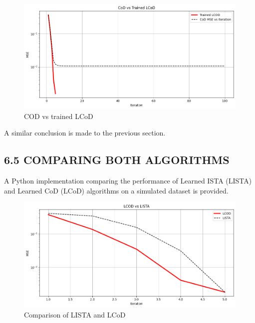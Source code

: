 \documentclass[
  letterpaper,
  DIV=11,
  numbers=noendperiod]{scrartcl}
\begin{document}
\begin{figure}[H]

{\centering \includegraphics[width=1\linewidth,height=\textheight,keepaspectratio]{abar-cs_files/mediabag/CoDvsTrainedCoD.png}

}

\caption{COD vs trained LCoD}

\end{figure}%

A similar conclusion is made to the previous section.

\subsection{6.5 COMPARING BOTH
ALGORITHMS}\label{comparing-both-algorithms}

A Python implementation comparing the performance of Learned ISTA
(LISTA) and Learned CoD (LCoD) algorithms on a simulated dataset is
provided.

\begin{figure}[H]

{\centering \includegraphics[width=1\linewidth,height=\textheight,keepaspectratio]{abar-cs_files/mediabag/lista_vs_lcod.png}

}

\caption{Comparison of LISTA and LCoD}

\end{figure}%
\end{document}
